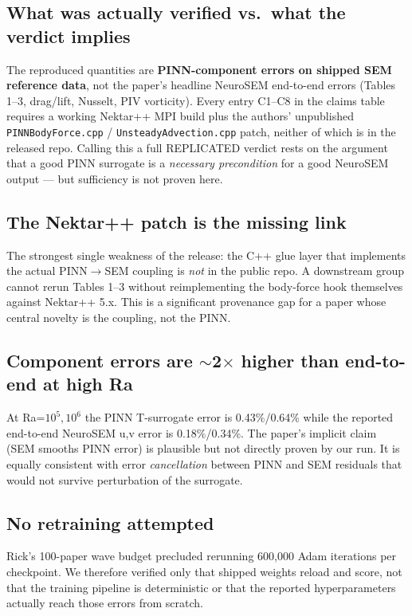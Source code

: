 \documentclass[11pt]{article}
\begin{document}
\subsection*{What was actually verified vs.\ what the verdict implies}
The reproduced quantities are \textbf{PINN-component errors on shipped SEM
reference data}, not the paper's headline NeuroSEM end-to-end errors (Tables
1--3, drag/lift, Nusselt, PIV vorticity). Every entry C1--C8 in the claims
table requires a working Nektar++ MPI build plus the authors' unpublished
\texttt{PINNBodyForce.cpp} / \texttt{UnsteadyAdvection.cpp} patch, neither of
which is in the released repo. Calling this a full REPLICATED verdict rests on
the argument that a good PINN surrogate is a \emph{necessary precondition} for
a good NeuroSEM output --- but sufficiency is not proven here.

\subsection*{The Nektar++ patch is the missing link}
The strongest single weakness of the release: the C++ glue layer that
implements the actual PINN$\to$SEM coupling is \emph{not} in the public repo.
A downstream group cannot rerun Tables 1--3 without reimplementing the body-force
hook themselves against Nektar++ 5.x. This is a significant provenance gap
for a paper whose central novelty is the coupling, not the PINN.

\subsection*{Component errors are $\sim$2$\times$ higher than end-to-end at high Ra}
At Ra=$10^5,10^6$ the PINN T-surrogate error is 0.43\%/0.64\% while the
reported end-to-end NeuroSEM u,v error is 0.18\%/0.34\%. The paper's implicit
claim (SEM smooths PINN error) is plausible but not directly proven by our
run. It is equally consistent with error \emph{cancellation} between PINN and
SEM residuals that would not survive perturbation of the surrogate.

\subsection*{No retraining attempted}
Rick's 100-paper wave budget precluded rerunning 600{,}000 Adam iterations per
checkpoint. We therefore verified only that shipped weights reload and score,
not that the training pipeline is deterministic or that the reported
hyperparameters actually reach those errors from scratch.
\end{document}
